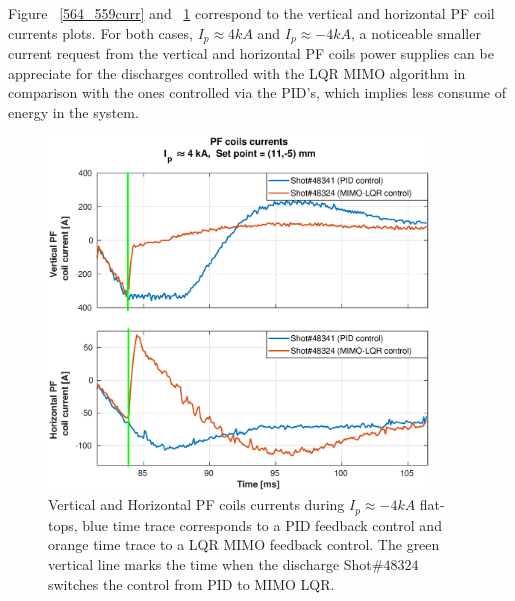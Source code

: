  Figure ~\ref{564_559curr} and ~\ref{341_342_curr} correspond to the vertical and horizontal PF coil currents plots. For both cases, $I_p\approx 4kA$ and $I_p\approx -4kA$, a noticeable smaller current  request from the vertical and horizontal PF coils power supplies can be appreciate for the discharges controlled with the LQR MIMO algorithm in comparison with the ones controlled via the PID's, which implies  less consume of energy in the system.\smallskip

 \begin{figure}[h]
 	\centering
 	\includegraphics[width=0.9\textwidth]{Chp5/PIDvsMIMO_341_324_curr_2.eps}
 	\caption{ Vertical and Horizontal PF coils currents during  $I_p\approx -4kA$  flat-tops, blue time trace corresponds to a PID feedback control and orange time trace to a LQR MIMO feedback control. The green vertical line marks the time  when the  discharge Shot$\# 48324$ switches the control from PID to MIMO LQR. \label{341_342_curr}}
 \end{figure}
 


